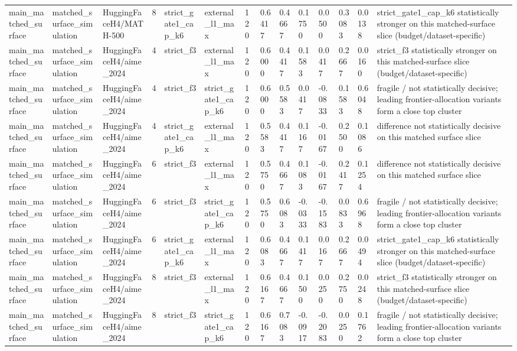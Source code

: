 \begin{tabular}{llllllllllllll}
main\_matched\_surface & matched\_surface\_simulation & HuggingFaceH4/MATH-500 & 8 & strict\_gate1\_cap\_k6 & external\_l1\_max & 120 & 0.6417 & 0.4667 & 0.1750 & 0.0500 & 0.3083 & 0.0138 & strict\_gate1\_cap\_k6 statistically stronger on this matched-surface slice (budget/dataset-specific) \\
main\_matched\_surface & matched\_surface\_simulation & HuggingFaceH4/aime\_2024 & 4 & strict\_f3 & external\_l1\_max & 120 & 0.6000 & 0.4417 & 0.1583 & 0.0417 & 0.2667 & 0.0160 & strict\_f3 statistically stronger on this matched-surface slice (budget/dataset-specific) \\
main\_matched\_surface & matched\_surface\_simulation & HuggingFaceH4/aime\_2024 & 4 & strict\_f3 & strict\_gate1\_cap\_k6 & 120 & 0.6000 & 0.5583 & 0.0417 & -0.0833 & 0.1583 & 0.6048 & fragile / not statistically decisive; leading frontier-allocation variants form a close top cluster \\
main\_matched\_surface & matched\_surface\_simulation & HuggingFaceH4/aime\_2024 & 4 & strict\_gate1\_cap\_k6 & external\_l1\_max & 120 & 0.5583 & 0.4417 & 0.1167 & -0.0167 & 0.2500 & 0.1086 & difference not statistically decisive on this matched surface slice \\
main\_matched\_surface & matched\_surface\_simulation & HuggingFaceH4/aime\_2024 & 6 & strict\_f3 & external\_l1\_max & 120 & 0.5750 & 0.4667 & 0.1083 & -0.0167 & 0.2417 & 0.1254 & difference not statistically decisive on this matched surface slice \\
main\_matched\_surface & matched\_surface\_simulation & HuggingFaceH4/aime\_2024 & 6 & strict\_f3 & strict\_gate1\_cap\_k6 & 120 & 0.5750 & 0.6083 & -0.0333 & -0.1583 & 0.0833 & 0.6968 & fragile / not statistically decisive; leading frontier-allocation variants form a close top cluster \\
main\_matched\_surface & matched\_surface\_simulation & HuggingFaceH4/aime\_2024 & 6 & strict\_gate1\_cap\_k6 & external\_l1\_max & 120 & 0.6083 & 0.4667 & 0.1417 & 0.0167 & 0.2667 & 0.0494 & strict\_gate1\_cap\_k6 statistically stronger on this matched-surface slice (budget/dataset-specific) \\
main\_matched\_surface & matched\_surface\_simulation & HuggingFaceH4/aime\_2024 & 8 & strict\_f3 & external\_l1\_max & 120 & 0.6167 & 0.4667 & 0.1500 & 0.0250 & 0.2750 & 0.0248 & strict\_f3 statistically stronger on this matched-surface slice (budget/dataset-specific) \\
main\_matched\_surface & matched\_surface\_simulation & HuggingFaceH4/aime\_2024 & 8 & strict\_f3 & strict\_gate1\_cap\_k6 & 120 & 0.6167 & 0.7083 & -0.0917 & -0.2083 & 0.0250 & 0.1762 & fragile / not statistically decisive; leading frontier-allocation variants form a close top cluster \\

\end{tabular}
